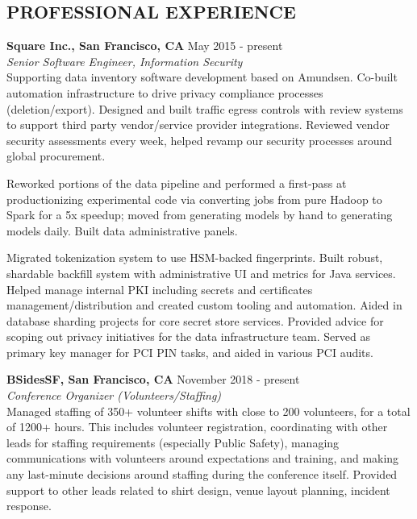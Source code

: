 \documentclass[line,margin]{res}
\begin{document}

\address{https://www.shh.sh}
\address{s@shh.sh}
\begin{resume}

\section{PROFESSIONAL EXPERIENCE}
{\bf Square Inc., San Francisco, CA} \hfill {May 2015 - present} \\
{\sl Senior Software Engineer, Information Security}\\
Supporting data inventory software development based on Amundsen. Co-built automation infrastructure to drive privacy compliance processes (deletion/export). Designed and built traffic egress controls with review systems to support third party vendor/service provider integrations. Reviewed vendor security assessments every week, helped revamp our security processes around global procurement.

Reworked portions of the data pipeline and performed a first-pass at productionizing experimental code via converting jobs from pure Hadoop to Spark for a 5x speedup; moved from generating models by hand to generating models daily. Built data administrative panels. 

Migrated tokenization system to use HSM-backed fingerprints. Built robust, shardable backfill system with administrative UI and metrics for Java services. Helped manage internal PKI including secrets and certificates management/distribution and created custom tooling and automation. Aided in database sharding projects for core secret store services. Provided advice for scoping out privacy initiatives for the data infrastructure team. Served as primary key manager for PCI PIN tasks, and aided in various PCI audits.

{\bf BSidesSF, San Francisco, CA}  \hfill {November 2018 - present} \\
{\sl Conference Organizer (Volunteers/Staffing)}\\
Managed staffing of 350+ volunteer shifts with close to 200 volunteers, for a total of 1200+ hours. This includes volunteer registration, coordinating with other leads for staffing requirements (especially Public Safety), managing communications with volunteers around expectations and training, and making any last-minute decisions around staffing during the conference itself. Provided support to other leads related to shirt design, venue layout planning, incident response.


\end{resume}
\end{document}
